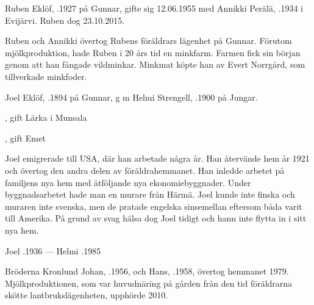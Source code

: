 Ruben Eklöf,  .1927 på Gunnar, gifte sig 12.06.1955 med Annikki  Perälä,  .1934 i Evijärvi. Ruben dog 23.10.2015.
\begin{jhchildren}
  \item {}
  \item {}
\end{jhchildren}

Ruben och Annikki övertog Rubens föräldrars lägenhet på Gunnar. Förutom mjölkproduktion, hade Ruben i 20 års tid en minkfarm. Farmen fick sin början genom att han fångade vildminkar. Minkmat köpte han av Evert Norrgård, som tillverkade minkfoder.


Joel Eklöf, .1894 på Gunnar, g m Helmi Strengell, .1900 på Jungar.
\begin{jhchildren}
  \item {}, gift Lärka i Munsala
  \item {}
  \item {}, gift Emet
\end{jhchildren}

Joel emigrerade till USA, där han arbetade några år. Han återvände hem år 1921 och övertog den andra delen av föräldrahemmanet. Han inledde arbetet på familjens nya hem med åtföljande nya ekonomiebyggnader. Under byggnadsarbetet hade man en murare från Härmä. Joel kunde inte finska och muraren inte svenska, men de pratade engelska sinsemellan eftersom båda varit till Amerika. På grund av svag hälsa dog Joel tidigt och hann inte flytta in i sitt nya hem.

Joel .1936  ---  Helmi .1985






Bröderna Kronlund Johan, .1956, och Hans, .1958, övertog hemmanet 1979. Mjölkproduktionen, som var huvudnäring på gården från den tid föräldrarna skötte lantbrukslägenheten, upphörde 2010.

